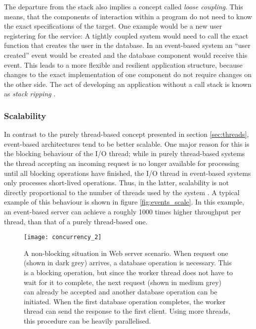 The departure from the stack also implies a concept called \textit{loose coupling}. This means, that the components of interaction within a program do not need to know the exact specifications of the target. One example would be a new user registering for the service: A tightly coupled system would need to call the exact function that creates the user in the database. In an event-based system an ``user created'' event would be created and the database component would receive this event. This leads to a more flexible and resilient application structure, because changes to the exact implementation of one component do not require changes on the other side. The act of developing an application without a call stack is known as \textit{stack ripping} \cite{Drolia2010}.

\subsubsection*{Scalability}
In contrast to the purely thread-based concept presented in section \ref{sec:threads}, event-based architectures tend to be better scalable. One major reason for this is the blocking behaviour of the I/O thread; while in purely thread-based systems the thread accepting an incoming request is no longer available for processing until all blocking operations have finished, the I/O thread in event-based systems only processes short-lived operations. Thus, in the latter, scalability is not directly proportional to the number of threads used by the system \cite[p. 2]{Carrera}. A typical example of this behaviour is shown in figure \ref{fig:events_scale}. In this example, an event-based server can achieve a roughly 1000 times higher throughput per thread, than that of a purely thread-based one.

\begin{figure}
\centering\small
\setlength{\tabcolsep}{0mm}
  \texttt{[image: concurrency\_2]}
\caption{
A non-blocking situation in Web server scenario. When request one (shown in dark grey) arrives, a database operation is necessary. This is a blocking operation, but since the worker thread does not have to wait for it to complete, the next request (shown in medium grey) can already be accepted and another database operation can be initiated. When the first database operation completes, the worker thread can send the response to the first client. Using more threads, this procedure can be heavily parallelised.
}
\label{fig:concurrency_2}
\end{figure}

